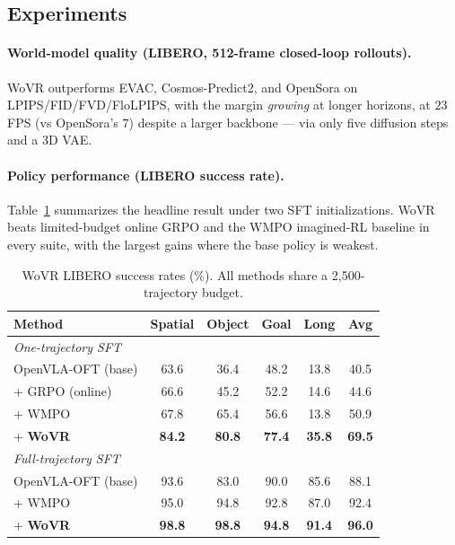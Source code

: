 \documentclass[11pt]{article}
\begin{document}
\subsection{Experiments}
\paragraph{World-model quality (LIBERO, 512-frame closed-loop rollouts).} WoVR outperforms EVAC,
Cosmos-Predict2, and OpenSora on LPIPS/FID/FVD/FloLPIPS, with the margin \emph{growing} at longer
horizons, at $23$ FPS (vs OpenSora's $7$) despite a larger backbone --- via only five diffusion steps and
a 3D VAE.

\paragraph{Policy performance (LIBERO success rate).} Table~\ref{tab:wovr-sr} summarizes the headline
result under two SFT initializations. WoVR beats limited-budget online GRPO and the WMPO imagined-RL
baseline in every suite, with the largest gains where the base policy is weakest.

\begin{table}[h]
\centering
\caption{WoVR LIBERO success rates (\%). All methods share a 2{,}500-trajectory budget.}
\label{tab:wovr-sr}
\begin{tabular}{lccccc}
\toprule
Method & Spatial & Object & Goal & Long & Avg\\
\midrule
\multicolumn{6}{l}{\emph{One-trajectory SFT}}\\
OpenVLA-OFT (base) & 63.6 & 36.4 & 48.2 & 13.8 & 40.5\\
\;+ GRPO (online)  & 66.6 & 45.2 & 52.2 & 14.6 & 44.6\\
\;+ WMPO           & 67.8 & 65.4 & 56.6 & 13.8 & 50.9\\
\;+ \textbf{WoVR}  & \textbf{84.2} & \textbf{80.8} & \textbf{77.4} & \textbf{35.8} & \textbf{69.5}\\
\midrule
\multicolumn{6}{l}{\emph{Full-trajectory SFT}}\\
OpenVLA-OFT (base) & 93.6 & 83.0 & 90.0 & 85.6 & 88.1\\
\;+ WMPO           & 95.0 & 94.8 & 92.8 & 87.0 & 92.4\\
\;+ \textbf{WoVR}  & \textbf{98.8} & \textbf{98.8} & \textbf{94.8} & \textbf{91.4} & \textbf{96.0}\\
\bottomrule
\end{tabular}
\end{table}
\end{document}
